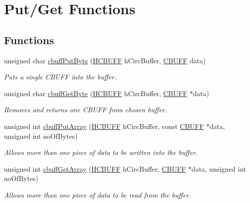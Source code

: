 \hypertarget{group___c_b_u_f_fput_get_functions}{
\section{Put/Get Functions}
\label{group___c_b_u_f_fput_get_functions}
}
\subsection*{Functions}
\begin{DoxyCompactItemize}
\item 
unsigned char \hyperlink{group___c_b_u_f_fput_get_functions_ga999b3c089262828104f8e8e10cefb5cd}{cbuffPutByte} (\hyperlink{group___c_b_u_f_fdata_types_ga554880d758aa53ae40930fbb49412e60}{HCBUFF} hCircBuffer, \hyperlink{group___c_b_u_f_fdata_types_ga4c6278cce108e0ee8bb1b9c609d0cbf4}{CBUFF} data)
\begin{DoxyCompactList}\small\item\em Puts a single CBUFF into the buffer. \item\end{DoxyCompactList}\item 
unsigned char \hyperlink{group___c_b_u_f_fput_get_functions_gafef77f05cad83c77f2a52e2e7477e3bc}{cbuffGetByte} (\hyperlink{group___c_b_u_f_fdata_types_ga554880d758aa53ae40930fbb49412e60}{HCBUFF} hCircBuffer, \hyperlink{group___c_b_u_f_fdata_types_ga4c6278cce108e0ee8bb1b9c609d0cbf4}{CBUFF} $\ast$data)
\begin{DoxyCompactList}\small\item\em Removes and returns one CBUFF from chosen buffer. \item\end{DoxyCompactList}\item 
unsigned int \hyperlink{group___c_b_u_f_fput_get_functions_ga96aa549fceaf66b586b1527d59715092}{cbuffPutArray} (\hyperlink{group___c_b_u_f_fdata_types_ga554880d758aa53ae40930fbb49412e60}{HCBUFF} hCircBuffer, const \hyperlink{group___c_b_u_f_fdata_types_ga4c6278cce108e0ee8bb1b9c609d0cbf4}{CBUFF} $\ast$data, unsigned int noOfBytes)
\begin{DoxyCompactList}\small\item\em Allows more than one piece of data to be written into the buffer. \item\end{DoxyCompactList}\item 
unsigned int \hyperlink{group___c_b_u_f_fput_get_functions_ga910285aaa6134396f061ab0e7031e826}{cbuffGetArray} (\hyperlink{group___c_b_u_f_fdata_types_ga554880d758aa53ae40930fbb49412e60}{HCBUFF} hCircBuffer, \hyperlink{group___c_b_u_f_fdata_types_ga4c6278cce108e0ee8bb1b9c609d0cbf4}{CBUFF} $\ast$data, unsigned int noOfBytes)
\begin{DoxyCompactList}\small\item\em Allows more than one piece of data to be read from the buffer. \item\end{DoxyCompactList}\end{DoxyCompactItemize}



